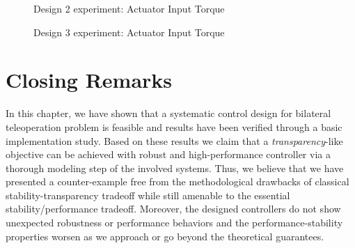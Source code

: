 \begin{figure}%
\centering
{}
\caption{Design 2 experiment: Actuator Input Torque}%
\label{fig:app:design2actoverall}%
\end{figure}

\begin{figure}%
\centering
{}
\caption{Design 3 experiment: Actuator Input Torque}%
\label{fig:app:design3actoverall}%
\end{figure}

\clearpage

\section{Closing Remarks}

In this chapter, we have shown that a systematic control design for bilateral teleoperation problem is feasible and results have been 
verified through a basic implementation study. Based on these results we claim that a \emph{transparency}-like objective can be achieved 
with robust and high-performance controller via a thorough modeling step of the involved systems. Thus, we believe that we have presented 
a counter-example free from the methodological drawbacks of classical stability-transparency tradeoff while still amenable to the 
essential stability/performance tradeoff. Moreover, the designed controllers do not show unexpected robustness or performance behaviors 
and the performance-stability properties worsen as we approach or go beyond the theoretical guarantees. 

